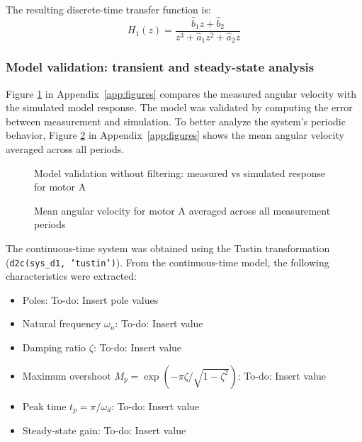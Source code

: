 \documentclass{article}
\begin{document}
	The resulting discrete-time transfer function is:
	\begin{equation}
		H_1(z) = \frac{\hat{b}_1 z + \hat{b}_2}{z^3 + \hat{a}_1 z^2 + \hat{a}_2 z}
	\end{equation}
	
	\subsubsection{Model validation: transient and steady-state analysis}
	
	Figure \ref{fig:validation_unfiltered} in Appendix~\ref{app:figures} compares the measured angular velocity with the simulated model response. The model was validated by computing the error between measurement and simulation. To better analyze the system's periodic behavior, Figure \ref{fig:omega_mean} in Appendix~\ref{app:figures} shows the mean angular velocity averaged across all periods.
	
	\begin{figure}[htbp]
		\centering
		\caption{Model validation without filtering: measured vs simulated response for motor A}
		\label{fig:validation_unfiltered}
	\end{figure}
	
	\begin{figure}[h]
		\centering
		\caption{Mean angular velocity for motor A averaged across all measurement periods}
		\label{fig:omega_mean}
	\end{figure}
	
	The continuous-time system was obtained using the Tustin transformation (\texttt{d2c(sys\_d1, 'tustin')}). From the continuous-time model, the following characteristics were extracted:
	\begin{itemize}
		\item Poles: To-do: Insert pole values
		\item Natural frequency $\omega_n$: To-do: Insert value
		\item Damping ratio $\zeta$: To-do: Insert value
		\item Maximum overshoot $M_p = \exp\left(-\pi\zeta/\sqrt{1-\zeta^2}\right)$: To-do: Insert value
		\item Peak time $t_p = \pi/\omega_d$: To-do: Insert value
		\item Steady-state gain: To-do: Insert value
	\end{itemize}
	
\end{document}

